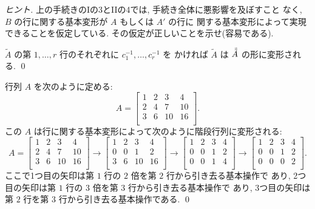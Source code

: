\documentclass[12pt,twoside]{jarticle}
\begin{document}
\begin{proof}[ヒント]
  上の手続きのIの3とIIの4では, 手続き全体に悪影響を及ぼすこと
  なく, $B$ の行に関する基本変形が $A$ もしくは $A'$ の行に
  関する基本変形によって実現できることを仮定している.
  その仮定が正しいことを示せ(容易である).

  $\tilde{A}$ の第 $1,\ldots,r$ 行のそれぞれに $c_1^{-1},\ldots,c_r^{-1}$ を
  かければ $\tilde{A}$ は $\Tilde{\Tilde{A}}$ の形に変形される.
  \qed
\end{proof}


\begin{example}
  \label{example:kaidan-1}
  行列 $A$ を次のように定める:
  \begin{equation*}
    A = 
    \begin{bmatrix}
      1 & 2 & 3  & 4 \\
      2 & 4 & 7  & 10 \\
      3 & 6 & 10 & 16 \\
    \end{bmatrix}.
  \end{equation*}
  この $A$ は行に関する基本変形によって次のように階段行列に変形される:
  \begin{equation*}
    A =
    \begin{bmatrix}
      1 & 2 & 3  & 4 \\
      2 & 4 & 7  & 10 \\
      3 & 6 & 10 & 16 \\
    \end{bmatrix}
    \to
    \begin{bmatrix}
      1 & 2 &  3 &  4 \\
      0 & 0 &  1 &  2 \\
      3 & 6 & 10 & 16 \\
    \end{bmatrix}
    \to
    \begin{bmatrix}
      1 & 2 & 3 & 4 \\
      0 & 0 & 1 & 2 \\
      0 & 0 & 1 & 4 \\
    \end{bmatrix}
    \to
    \begin{bmatrix}
      1 & 2 & 3 & 4 \\
      0 & 0 & 1 & 2 \\
      0 & 0 & 0 & 2 \\
    \end{bmatrix}.
  \end{equation*}
  ここで1つ目の矢印は第 $1$ 行の $2$ 倍を第 $2$ 行から引き去る基本操作で
  あり, 2つ目の矢印は第 $1$ 行の $3$ 倍を第 $3$ 行から引き去る基本操作で
  あり, 3つ目の矢印は 第 $2$ 行を第 $3$ 行から引き去る基本操作である.
  \qed
\end{example}
\end{document}
